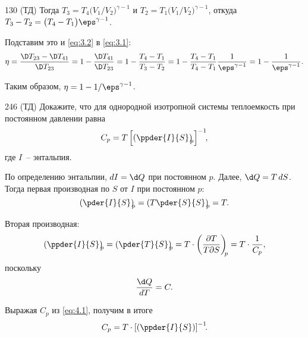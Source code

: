 \documentclass[pscyr]{hedwork}
\begin{document}
\begin{task}{130 (ТД)}
    Тогда \( T_3 = T_4 \bigl(V_1 / V_2\big)^{\gamma - 1} \) и
    \( T_2 = T_1 \bigl(V_1 / V_2\big)^{\gamma - 1} \), откуда
    \( T_3 - T_2 = \bigl(T_4 - T_1\big)\eps^{\gamma - 1} \).

    Подставим это и \eqref{eq:3.2} в \eqref{eq:3.1}:
    \[
      \eta = \frac{\D T_{23} - \D T_{41}}{\D T_{23}} =
        1 - \frac{\D T_{41}}{\D T_{23}} = 1 - \frac{T_4 - T_1}{T_3 - T_2} =
        1 - \frac{T_4 - T_1}{T_4 - T_1}\frac{1}{\eps^{\gamma - 1}} =
        1 - \frac{1}{\eps^{\gamma - 1}}.
    \]

    Таким образом, \( \eta = 1 - 1 / \eps^{\gamma - 1} \).

  \end{task}

  \begin{task}{246 (ТД)}{
    Докажите, что для однородной изотропной системы теплоемкость при постоянном
    давлении равна
    \[
      C_p = T\left[\left(\ppder{I}{S}\right)_{\!\!p}\right]^{-1}\!\!,
    \]
    где \( I \)~-- энтальпия.
  }

    По определению энтальпии, \( dI = \d Q \) при постоянном \( p \).
    Далее, \( \d Q = T\,dS \). Тогда первая производная по
    \( S \) от \( I \) при постоянном \( p \):
    \[
      \left(\pder{I}{S}\right)_{\!\!p} = \left(T\pder{S}{S}\right)_{\!\!p} = T.
    \]

    Вторая производная:
    \begin{equation}
      \left(\ppder{I}{S}\right)_{\!\!p} = \left(\pder{T}{S}\right)_{\!\!p} =
        T \cdot \left(\frac{\partial T}{T\partial S}\right)_{\!\!p} =
        T \cdot \frac{1}{C_p},
      \label{eq:4.1}
    \end{equation}
    поскольку
    \[
      \frac{\d Q}{dT} = C.
    \]

    Выражая \( C_p \) из \eqref{eq:4.1}, получим в итоге
    \[
      C_p = T \cdot \left[\left(\ppder{I}{S}\right)\right]^{-1}\!\!.
    \]

  \end{task}
\end{document}
